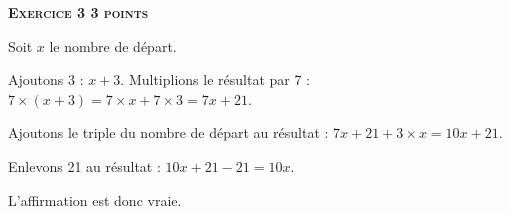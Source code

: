 \textbf{\textsc{Exercice 3 \hfill 3 points}}

\medskip

Soit $x$ le nombre de départ.

Ajoutons 3 : $x + 3$. Multiplions le résultat par 7 : $7\times (x + 3) = 7\times x+7\times 3 = 7x + 21$.

Ajoutons le triple du nombre de départ au résultat : $7x + 21 + 3\times x = 10x + 21$.

Enlevons 21 au résultat : $10x + 21 - 21 = 10x$.

L’affirmation est donc  vraie.

\vspace{0,5cm}

